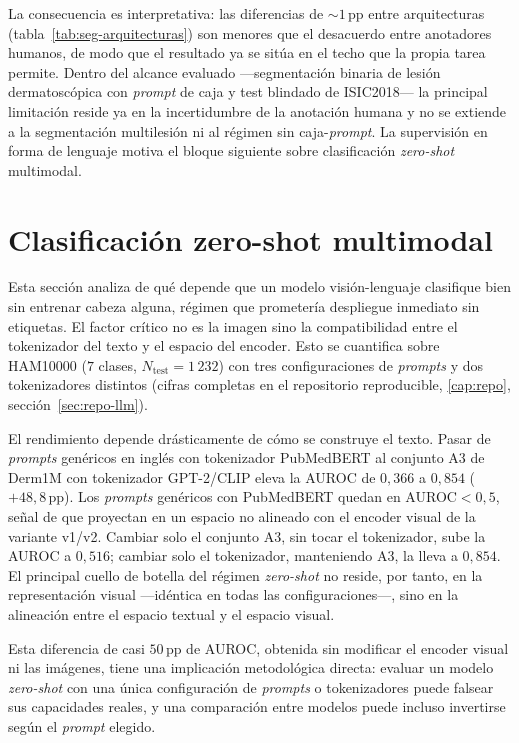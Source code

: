 La consecuencia es interpretativa: las diferencias de $\sim 1$\,pp entre
arquitecturas (tabla~\ref{tab:seg-arquitecturas}) son menores que el
desacuerdo entre anotadores humanos, de modo que el resultado ya se
sitúa en el techo que la propia tarea permite. Dentro del alcance
evaluado ---segmentación binaria de lesión dermatoscópica con
\emph{prompt} de caja y test blindado de ISIC2018--- la principal
limitación reside ya en la incertidumbre de la anotación humana y no se
extiende a la segmentación multilesión ni al régimen sin
caja-\emph{prompt}. La supervisión en forma de lenguaje motiva el bloque
siguiente sobre clasificación \emph{zero-shot} multimodal.

\section{Clasificación zero-shot multimodal}
\label{sec:zs-results}

Esta sección analiza de qué depende que un modelo visión-lenguaje
clasifique bien sin entrenar cabeza alguna, régimen que prometería
despliegue inmediato sin etiquetas. El factor crítico no es la imagen
sino la compatibilidad entre el tokenizador del texto y el espacio del
encoder. Esto se cuantifica sobre HAM10000 ($7$ clases,
$N_{\mathrm{test}} = 1\,232$) con tres configuraciones de \emph{prompts}
y dos tokenizadores distintos (cifras completas en el repositorio
reproducible, \ref{cap:repo}, sección~\ref{sec:repo-llm}).

El rendimiento depende drásticamente de cómo se construye el texto.
Pasar de \emph{prompts} genéricos en inglés con tokenizador
PubMedBERT al conjunto A3 de Derm1M con tokenizador GPT-2/CLIP eleva
la AUROC de $0{,}366$ a $0{,}854$ ($+48{,}8$\,pp). Los
\emph{prompts} genéricos con PubMedBERT quedan en AUROC$<0{,}5$,
señal de que proyectan en un espacio no alineado con el encoder
visual de la variante v1/v2. Cambiar solo el conjunto A3, sin tocar
el tokenizador, sube la AUROC a $0{,}516$; cambiar solo el
tokenizador, manteniendo A3, la lleva a $0{,}854$. El principal cuello
de botella del régimen \emph{zero-shot} no reside, por tanto, en la
representación visual ---idéntica en todas las configuraciones---,
sino en la alineación entre el espacio textual y el espacio visual.

Esta diferencia de casi $50$\,pp de AUROC, obtenida sin modificar el
encoder visual ni las imágenes, tiene una implicación metodológica
directa: evaluar un modelo \emph{zero-shot} con una única configuración
de \emph{prompts} o tokenizadores puede falsear sus capacidades
reales, y una comparación entre modelos puede incluso invertirse según
el \emph{prompt} elegido.

